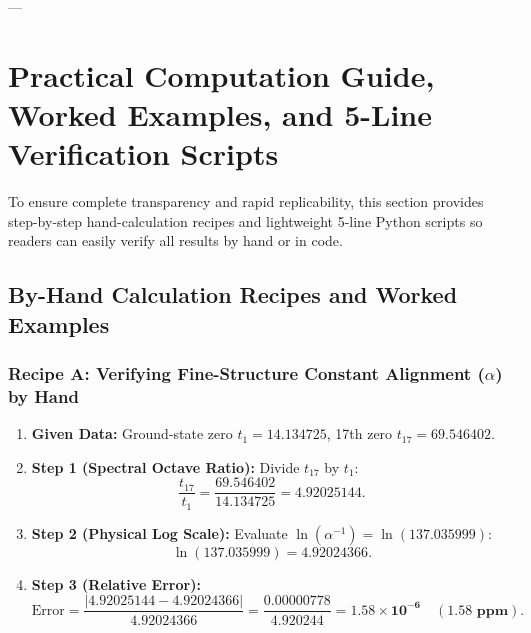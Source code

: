 \documentclass[11pt,a4paper]{article}
\begin{document}
---

\section{Practical Computation Guide, Worked Examples, and 5-Line Verification Scripts}

To ensure complete transparency and rapid replicability, this section provides step-by-step hand-calculation recipes and lightweight 5-line Python scripts so readers can easily verify all results by hand or in code.

\subsection{By-Hand Calculation Recipes and Worked Examples}

\subsubsection{Recipe A: Verifying Fine-Structure Constant Alignment (\texorpdfstring{$\alpha$}{alpha}) by Hand}
\begin{enumerate}
    \item \textbf{Given Data:} Ground-state zero $t_1 = 14.134725$, 17th zero $t_{17} = 69.546402$.
    \item \textbf{Step 1 (Spectral Octave Ratio):} Divide $t_{17}$ by $t_1$:
    \begin{equation}
    \frac{t_{17}}{t_1} = \frac{69.546402}{14.134725} = \mathbf{4.92025144}.
    \end{equation}
    \item \textbf{Step 2 (Physical Log Scale):} Evaluate $\ln(\alpha^{-1}) = \ln(137.035999)$:
    \begin{equation}
    \ln(137.035999) = \mathbf{4.92024366}.
    \end{equation}
    \item \textbf{Step 3 (Relative Error):}
    \begin{equation}
    \text{Error} = \frac{|4.92025144 - 4.92024366|}{4.92024366} = \frac{0.00000778}{4.920244} = \mathbf{1.58 \times 10^{-6} \quad (1.58 \text{ ppm})}.
    \end{equation}
\end{enumerate}
\end{document}

